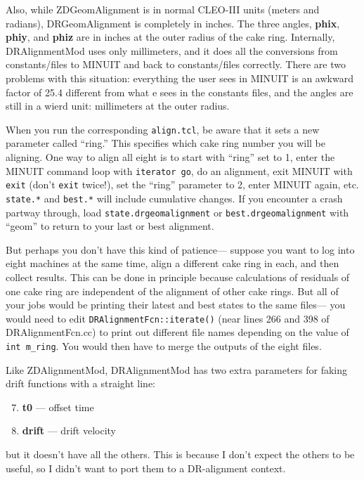 \documentclass[12pt]{article}
\begin{document}
Also, while ZDGeomAlignment is in normal CLEO-III units (meters and
radians), DRGeomAlignment is completely in inches.  The three angles,
{\bf phix}, {\bf phiy}, and {\bf phiz} are in inches at the outer
radius of the cake ring.  Internally, DRAlignmentMod uses only
millimeters, and it does all the conversions from constants/files to
MINUIT and back to constants/files correctly.  There are two problems
with this situation: everything the user sees in MINUIT is an awkward
factor of 25.4 different from what e sees in the constants files, and
the angles are still in a wierd unit: millimeters at the outer radius.

When you run the corresponding {\tt align.tcl}, be aware that it sets
a new parameter called ``ring.''  This specifies which cake ring
number you will be aligning.  One way to align all eight is to start
with ``ring'' set to 1, enter the MINUIT command loop with
{\tt iterator go}, do an alignment, exit MINUIT with {\tt exit} (don't
{\tt exit} twice!), set the ``ring'' parameter to 2, enter MINUIT again,
etc.  {\tt state.*} and {\tt best.*} will include cumulative changes.
If you encounter a crash partway through, load
{\tt state.drgeomalignment} or {\tt best.drgeomalignment} with
``geom'' to return to your last or best alignment.

But perhaps you don't have this kind of patience--- suppose you want
to log into eight machines at the same time, align a different cake
ring in each, and then collect results.  This can be done in principle
because calculations of residuals of one cake ring are independent of
the alignment of other cake rings.  But all of your jobs would be
printing their latest and best states to the same files--- you would
need to edit {\tt DRAlignmentFcn::iterate()} (near lines 266 and 398
of DRAlignmentFcn.cc) to print out different file names depending on
the value of {\tt int m\_ring}.  You would then have to merge the
outputs of the eight files.

Like ZDAlignmentMod, DRAlignmentMod has two extra parameters for
faking drift functions with a straight line:
\begin{enumerate}\setcounter{enumi}{6}
  \item {\bf t0} --- offset time
  \item {\bf drift} --- drift velocity
\end{enumerate}
but it doesn't have all the others.  This is because I don't expect
the others to be useful, so I didn't want to port them to a
DR-alignment context.
\end{document}
